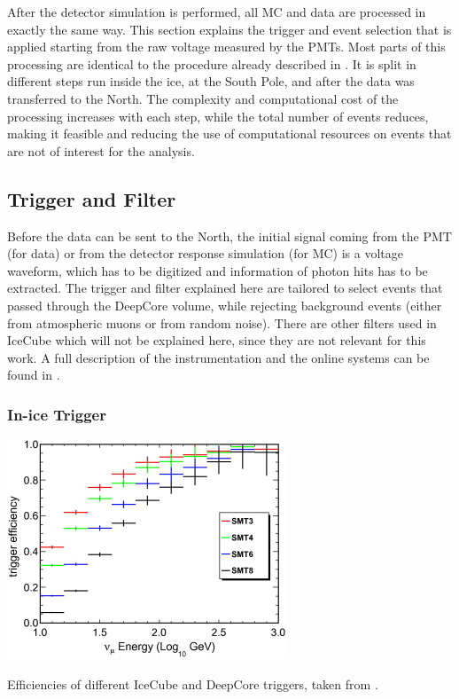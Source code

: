After the detector simulation is performed, all MC and data are processed in exactly the same way. This section explains the trigger and event selection that is applied starting from the raw voltage measured by the PMTs. Most parts of this processing are identical to the procedure already described in . It is split in different steps run inside the ice, at the South Pole, and after the data was transferred to the North. The complexity and computational cost of the processing increases with each step, while the total number of events reduces, making it feasible and reducing the use of computational resources on events that are not of interest for the analysis. 


\subsection{Trigger and Filter} 

Before the data can be sent to the North, the initial signal coming from the PMT (for data) or from the detector response simulation (for MC) is a voltage waveform, which has to be digitized and information of photon hits has to be extracted. The trigger and filter explained here are tailored to select events that passed through the DeepCore volume, while rejecting background events (either from atmospheric muons or from random noise). There are other filters used in IceCube which will not be explained here, since they are not relevant for this work. A full description of the instrumentation and the online systems can be found in .


\subsubsection{In-ice Trigger} 

\begin{marginfigure}
    \includegraphics{figures/simulation_and_processing/trigger/trigger_efficiency.jpg}
	\caption[IceCube trigger efficiencies]{Efficiencies of different IceCube and DeepCore triggers, taken from \cite{DeepCore_design_Abbasi2012615}.}
\end{marginfigure}

